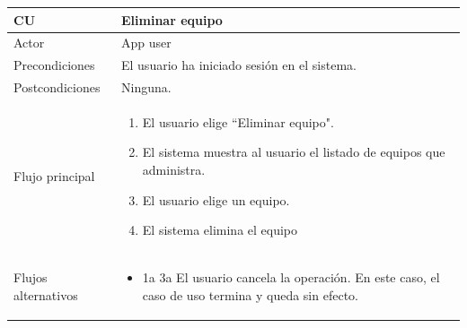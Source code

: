 \documentclass[twoside]{report}
\newcommand\addrow[2]{#1 &#2\\ }
\newcommand\addheading[2]{#1 &#2\\ \hline}
\newcommand\tabularhead{\begin{tabular}{lp{0.7\textwidth}}
\hline
}
\newenvironment{usecase}{\tabularhead}
{\hline\end{tabular}}
\begin{document}
\begin{usecase}
  \addheading{\textbf{CU\arabic{usecase}}}{Eliminar equipo} 
  \addrow{Actor}{App user}
  \addrow{Precondiciones}{El usuario ha iniciado sesión en el sistema.}
  \addrow{Postcondiciones}{Ninguna.}
  \addrow{Flujo principal}{
  		\begin{enumerate}
  		\item El usuario elige “Eliminar equipo". %
  		\item El sistema muestra al usuario el listado de equipos que administra. %
  		\item El usuario elige un equipo. %
  		\item El sistema elimina el equipo %
  		\end{enumerate}
  }
  \addrow{Flujos alternativos}{
  		\begin{itemize}
  		\item 1a 3a El usuario cancela la operación. En este caso, el caso de uso termina y queda sin efecto.
  		\end{itemize}
  }
\end{usecase}\\
\end{document}
